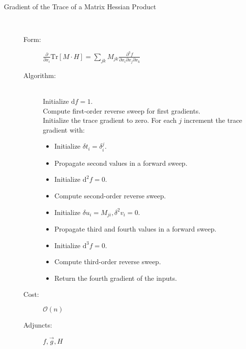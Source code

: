 \documentclass[11pt]{article}
\begin{document}
\begin{description}
	\item[Gradient of the Trace of a Matrix Hessian Product] \hfill \\
	\begin{description}
		\item[Form:] 
		$\displaystyle \frac{\partial}{\partial x_{i} } \mathrm{Tr} \! \left[ M \cdot H \right]
		= \sum_{jk} M_{jk} \frac{ \partial^{3} f }{ \partial x_{i}  \partial x_{j}  \partial x_{k} } $
		\item[Algorithm:] \hfill \\
		Initialize $\mathrm{d} f = 1$. \\
		Compute first-order reverse sweep for first gradients. \\
		Initialize the trace gradient to zero.
		For each $j$ increment the trace gradient with:
		\begin{itemize}
			\setlength{\itemsep}{0cm}
			\setlength{\parskip}{0cm}
			\item[] Initialize $\delta t_{i} = \delta^{j}_{i}$.
			\item[] Propagate second values in a forward sweep. 
			\item[] Initialize $\mathrm{d}^{2} f = 0$.
			\item[] Compute second-order reverse sweep.
			\item[] Initialize $\delta u_{i} = M_{ji}, \delta^{2} v_{i} = 0$.
			\item[] Propagate third and fourth values in a  forward sweep.
			\item[] Initialize $\mathrm{d}^{3} f = 0$.
			\item[] Compute third-order reverse sweep.
			\item[] Return the fourth gradient of the inputs.
		\end{itemize}
		\item[Cost:] $\mathcal{O} \! \left( n \right)$
		\item[Adjuncts:] $ f, \vec{g}, H$
	\end{description}
	
\end{description}
\end{document}
